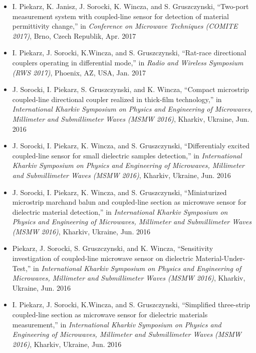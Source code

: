 \begin{itemize}[nosep]
\item I. Piekarz, K. Janisz, J. Sorocki, K. Wincza, and S. Gruszczynski, “Two-port measurement
system with coupled-line sensor for detection of material permittivity change,” in \textit{Conference on Microwave Techniques (COMITE 2017)}, Brno, Czech Republik, Apr. 2017
\item I. Piekarz, J. Sorocki, K.Wincza, and S. Gruszczynski, “Rat-race directional couplers operating in differential mode,” in \textit{Radio and Wireless Symposium (RWS 2017)}, Phoenix, AZ, USA, Jan. 2017
\item J. Sorocki, I. Piekarz, S. Gruszczynski, and K. Wincza, “Compact microstrip coupled-line
directional coupler realized in thick-film technology,” in \textit{International Kharkiv Symposium on Physics and Engineering of Microwaves, Millimeter and Submillimeter Waves (MSMW 2016)}, Kharkiv, Ukraine, Jun. 2016
\item J. Sorocki, I. Piekarz, K. Wincza, and S. Gruszczynski, “Differentialy excited coupled-line
sensor for small dielectric samples detection,” in \textit{International Kharkiv Symposium on Physics and Engineering of Microwaves, Millimeter and Submillimeter Waves (MSMW 2016)}, Kharkiv,
Ukraine, Jun. 2016
\item J. Sorocki, I. Piekarz, K. Wincza, and S. Gruszczynski, “Miniaturized microstrip marchand balun and coupled-line section as microwave sensor for dielectric material detection,” in \textit{International Kharkiv Symposium on Physics and Engineering of Microwaves, Millimeter and Submillimeter Waves (MSMW 2016)}, Kharkiv, Ukraine, Jun. 2016
\item Piekarz, J. Sorocki, S. Gruszczynski, and K. Wincza, “Sensitivity investigation of coupled-line microwave sensor on dielectric Material-Under-Test,” in \textit{International Kharkiv Symposium on Physics and Engineering of Microwaves, Millimeter and Submillimeter Waves (MSMW 2016)}, Kharkiv, Ukraine, Jun. 2016
\item I. Piekarz, J. Sorocki, K.Wincza, and S. Gruszczynski, “Simplified three-strip coupled-line section as microwave sensor for dielectric materials measurement,” in \textit{International Kharkiv Symposium on Physics and Engineering of Microwaves, Millimeter and Submillimeter Waves (MSMW 2016)}, Kharkiv, Ukraine, Jun. 2016

\end{itemize}
